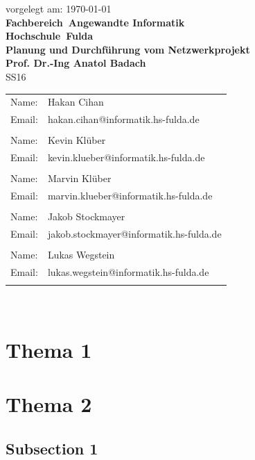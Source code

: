 \documentclass[a4paper,11pt]{article}
\begin{document}
\begin{titlepage}
\begin{center}
    \normalsize
    vorgelegt am: \today \\
    \vspace{0.5cm}
    \large \textbf{Fachbereich~Angewandte Informatik \\Hochschule~Fulda}\\
    \vspace{0.5cm}
    \huge \textbf{Planung und Durchführung vom Netzwerkprojekt}\\
    \vspace{0.5cm}
    \large \textbf{Prof. Dr.-Ing Anatol Badach}\\
    \vspace{0.5cm}
    \large{SS16}
    \vspace{0.5cm}
    \end{center}
 \normalsize{
    \begin{tabular}{ll}
    	Name: & {Hakan Cihan} \\
    	Email: & {hakan.cihan@informatik.hs-fulda.de} \\
    	\\
    	Name: & {Kevin Klüber} \\
    	Email: & {kevin.klueber@informatik.hs-fulda.de} \\
    	\\
    	Name: & {Marvin Klüber} \\
    	Email: & {marvin.klueber@informatik.hs-fulda.de} \\
	\\
    	Name: & {Jakob Stockmayer} \\
    	Email: & {jakob.stockmayer@informatik.hs-fulda.de} \\
	\\
    	Name: & {Lukas Wegstein} \\
    	Email: & {lukas.wegstein@informatik.hs-fulda.de} \\
	 \\
    	
    \end{tabular}\\
    }
\end{titlepage}
\newpage
\tableofcontents
\newpage
\makeatletter
\renewcommand{\l@figure}{\@dottedtocline{1}{0cm}{1.2cm}}
\makeatother
\listoffigures
\newpage

\section{Thema 1}


\section{Thema 2}
\subsection{Subsection 1}
\end{document}
